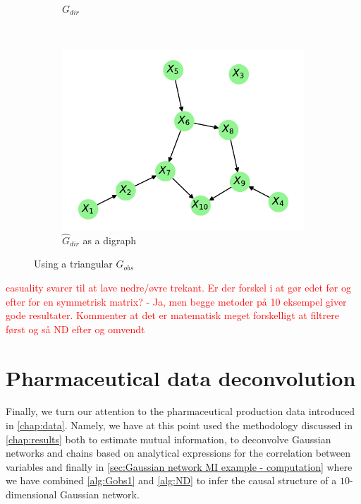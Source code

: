 \documentclass[../Thesis.tex]{subfiles}
\begin{document}
\begin{figure}[H]
\begin{subfigure}[t]{0.49\linewidth}
        \caption{$G_{dir}$}
    \end{subfigure}
    \\[\baselineskip]
    \begin{subfigure}[t]{0.49\linewidth}
        \includegraphics[width = \linewidth]{figures/ND examples/Gaussian network 10 - G_dir as graph - triangular.pdf}
        \caption{$\hat{G}_{dir}$ as a digraph}
    \end{subfigure}
    \caption{Using a triangular $G_{obs}$}
\end{figure}

\textcolor{red}{casuality svarer til at lave nedre/øvre trekant. Er der forskel i at gør edet før og efter for en symmetrisk matrix? - Ja, men begge metoder på 10 eksempel giver gode resultater. Kommenter at det er matematisk meget forskelligt at filtrere først og så ND efter og omvendt}



\newpage
\section{Pharmaceutical data deconvolution}
Finally, we turn our attention to the pharmaceutical production data introduced in \autoref{chap:data}. Namely, we have at this point used the methodology discussed in \autoref{chap:results} both to estimate mutual information, to deconvolve Gaussian networks and chains based on analytical expressions for the correlation between variables and finally in \autoref{sec:Gaussian network MI example - computation} where we have combined \autoref{alg:Gobs1} and \autoref{alg:ND} to infer the causal structure of a $10$-dimensional Gaussian network.
\end{document}
